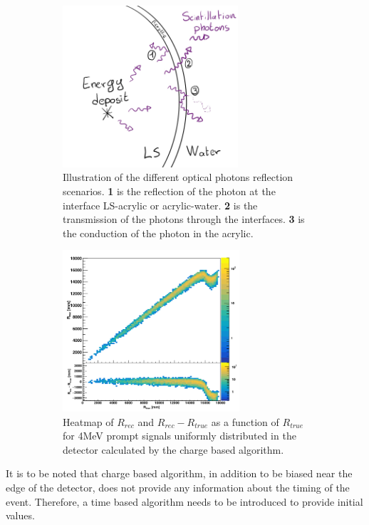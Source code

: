 \documentclass[../main.tex]{subfiles}
\begin{document}
\begin{figure}[ht]
  \begin{subfigure}[t]{0.48\textwidth}
    \centering
    \includegraphics[height=6cm]{images/juno/reco/Reflexion_scenarii.jpg}
    \caption{Illustration of the different optical photons reflection scenarios. \textbf{1} is the reflection of the photon at the interface LS-acrylic or acrylic-water. \textbf{2} is the transmission of the photons through the interfaces. \textbf{3} is the conduction of the photon in the acrylic.}
    \label{fig:juno:rec:refl}
  \end{subfigure}
  \hfill
  \begin{subfigure}[t]{0.48\textwidth}
    \centering
    \includegraphics[height=6cm]{images/juno/reco/charge_barycenter.png}
    \caption{Heatmap of $R_{rec}$ and $R_{rec} - R_{true}$ as a function of $R_{true}$ for 4MeV prompt signals uniformly distributed in the detector calculated by the charge based algorithm.}
    \label{fig:juno:rec:cbary}
  \end{subfigure}
  \caption{}
\end{figure}

It is to be noted that charge based algorithm, in addition to be biased near the edge of the detector, does not provide any information about the timing of the event. Therefore, a time based algorithm needs to be introduced to provide initial values.
\end{document}
